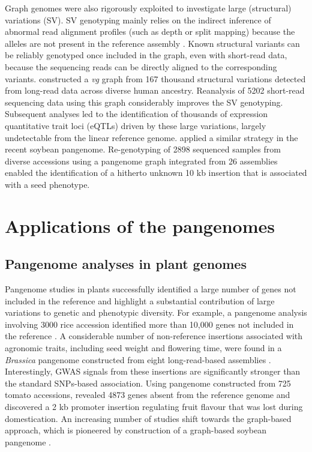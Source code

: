 \documentclass[../main.tex]{subfiles}
\begin{document}
Graph genomes were also rigorously exploited to investigate large (structural) variations (SV). SV genotyping mainly relies on the indirect inference of abnormal read alignment profiles (such as depth or split mapping) because the alleles are not present in the reference assembly \citep{mahmoud2019structural}. Known structural variants can be reliably  genotyped once included in the graph, even with short-read data, because the sequencing reads can be directly aligned to the corresponding variants. \citet{siren2020haplotype} constructed a \emph{vg} graph from 167 thousand structural variations detected from long-read data across diverse human ancestry. Reanalysis of 5202 short-read sequencing data using this graph considerably improves the SV genotyping. Subsequent analyses led to the identification of thousands of expression quantitative trait loci (eQTLs) driven by these large variations, largely undetectable from the linear reference genome. \citet{liu2020pan}  applied a similar strategy in the recent soybean pangenome. Re-genotyping of 2898 sequenced samples from diverse accessions using a pangenome graph integrated from 26 assemblies enabled the identification of a hitherto unknown 10 kb insertion that is associated with a seed phenotype. 

\section{Applications of the pangenomes}

\subsection*{Pangenome analyses in plant genomes}

Pangenome studies in plants successfully identified a large number of genes not included in the reference and highlight a substantial contribution of large variations to genetic and phenotypic diversity. For example, a pangenome analysis involving 3000 rice accession identified more than 10,000 genes not included in the reference \citep{wang2018genomic}. A considerable number of non-reference insertions associated with agronomic traits, including seed weight and flowering time, were found in a \emph{Brassica} pangenome constructed from eight long-read-based assemblies \citep{song2020eight}. Interestingly, GWAS signals from these insertions are significantly stronger than the standard SNPs-based association. Using pangenome constructed from 725 tomato accessions, \citet{gao2019tomato} revealed 4873 genes absent from the reference genome and discovered a 2 kb promoter insertion regulating fruit flavour that was lost during domestication. An increasing number of studies shift towards the graph-based approach, which is pioneered by construction of a graph-based soybean pangenome \citep{liu2020pan}. 
\end{document}
